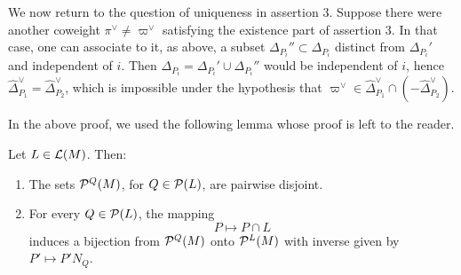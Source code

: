\begin{paragr}
\begin{preuve}
We now return to the question of uniqueness in assertion 3. Suppose there were another coweight $\pi^\vee\neq\varpi^\vee$ satisfying the existence part of assertion 3. In that case, one can associate to it, as above, a subset $\Delta_{P_i}''\subset \Delta_{P_i}$ distinct from $\Delta_{P_i}'$ and independent of $i$. Then $\Delta_{P_i}=\Delta_{P_i}'\cup \Delta_{P_i}''$ would be independent of $i$, hence $\hat{\Delta}_{P_1}^\vee=\hat{\Delta}_{P_2}^\vee$, which is impossible under the hypothesis that $\varpi^\vee \in \hat{\Delta}^\vee_{P_1}\cap(-\hat{\Delta}^\vee_{P_2})$.
\end{preuve}

In the above proof, we used the following lemma whose proof is left to the reader.

\begin{lemme}\label{lem:fibre}
  Let $L\in \mathcal{L}(M)$. Then:
  \begin{enumerate}
  \item The sets $\mathcal{P}^Q(M)$, for $Q\in \mathcal{P}(L)$, are pairwise disjoint.
  \item For every $Q\in \mathcal{P}(L)$, the mapping
$$P\mapsto P\cap L$$
induces a bijection from $\mathcal{P}^Q(M)$ onto $\mathcal{P}^L(M)$ with inverse given by $P'\mapsto P'N_Q$.
  \end{enumerate}
\end{lemme}
\end{paragr}


